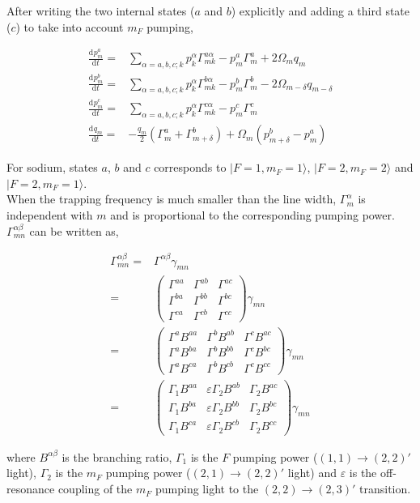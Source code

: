 \documentclass[10pt,fleqn]{article}
\newcommand{\ud}{\mathrm{d}}
\newcommand{\eqar}[1]
{
  \begin{align*}
    #1
  \end{align*}
}
\newcommand{\paren}[1]{{\left({#1}\right)}}
\newcommand{\diff}[3][{}]{{\frac{\ud^{#1} {#2}}{\ud {#3}{}^{#1}}}}
\begin{document}
After writing the two internal states ($a$ and $b$) explicitly and adding a third state ($c$) to take into account $m_F$ pumping,
\eqar{
  \diff{p^a_{m}}{t}=&\sum_{\alpha=a,b,c;k}p^\alpha_{k}\Gamma^{a\alpha}_{mk}-p^a_{m}\Gamma^a_{m}+2\Omega_{m}q_m\\
  \diff{p^b_{m}}{t}=&\sum_{\alpha=a,b,c;k}p^\alpha_{k}\Gamma^{b\alpha}_{mk}-p^b_{m}\Gamma^b_{m}-2\Omega_{m-\delta}q_{m-\delta}\\
  \diff{p^c_{m}}{t}=&\sum_{\alpha=a,b,c;k}p^\alpha_{k}\Gamma^{c\alpha}_{mk}-p^c_{m}\Gamma^c_{m}\\
  \diff{q_m}{t}=&-\frac{q_{m}}{2}\paren{\Gamma^a_{m}+\Gamma^b_{m+\delta}}+\Omega_{m}\paren{p^b_{m+\delta}-p^a_{m}}
}
For sodium, states $a$, $b$ and $c$ corresponds to $|F=1, m_F=1\rangle$, $|F=2, m_F=2\rangle$ and  $|F=2, m_F=1\rangle$.\\

When the trapping frequency is much smaller than the line width, $\Gamma^\alpha_m$ is independent with $m$ and is proportional to the corresponding pumping power. $\Gamma^{\alpha\beta}_{mn}$ can be written as,
\eqar{
  \Gamma^{\alpha\beta}_{mn}=&\Gamma^{\alpha\beta}\gamma_{mn}\\
  =&\begin{pmatrix}
    \Gamma^{aa}&\Gamma^{ab}&\Gamma^{ac}\\
    \Gamma^{ba}&\Gamma^{bb}&\Gamma^{bc}\\
    \Gamma^{ca}&\Gamma^{cb}&\Gamma^{cc}
  \end{pmatrix}\gamma_{mn}\\
  =&\begin{pmatrix}
    \Gamma^aB^{aa}&\Gamma^bB^{ab}&\Gamma^cB^{ac}\\
    \Gamma^aB^{ba}&\Gamma^bB^{bb}&\Gamma^cB^{bc}\\
    \Gamma^aB^{ca}&\Gamma^bB^{cb}&\Gamma^cB^{cc}
  \end{pmatrix}\gamma_{mn}\\
  =&\begin{pmatrix}
    \Gamma_1B^{aa}&\varepsilon\Gamma_2B^{ab}&\Gamma_2B^{ac}\\
    \Gamma_1B^{ba}&\varepsilon\Gamma_2B^{bb}&\Gamma_2B^{bc}\\
    \Gamma_1B^{ca}&\varepsilon\Gamma_2B^{cb}&\Gamma_2B^{cc}
  \end{pmatrix}\gamma_{mn}
}
where $B^{\alpha\beta}$ is the branching ratio, $\Gamma_1$ is the $F$ pumping power ($(1, 1) \rightarrow (2, 2)'$ light), $\Gamma_2$ is the $m_F$ pumping power ($(2, 1) \rightarrow (2, 2)'$ light) and $\varepsilon$ is the off-resonance coupling of the $m_F$ pumping light to the $(2, 2) \rightarrow (2, 3)'$ transition.
\end{document}
